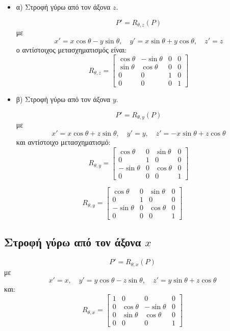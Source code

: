 \begin{itemize}
    \item α) Στροφή γύρω από τον άξονα $z$.

    \[
    P' = R_{\theta,z}(P)
    \]
    με
    \[
    x' = x \cos \theta - y \sin \theta, \quad y' = x \sin \theta + y \cos \theta, \quad z' = z
    \]
    ο αντίστοιχος μετασχηματισμός είναι:
    \[
    R_{\theta,z} = 
    \begin{bmatrix}
    \cos \theta & -\sin \theta & 0 & 0 \\
    \sin \theta & \cos \theta & 0 & 0 \\
    0 & 0 & 1 & 0 \\
    0 & 0 & 0 & 1
    \end{bmatrix}
    \]

    \item β) Στροφή γύρω από τον άξονα $y$.

    \[
    P' = R_{\theta,y}(P)
    \]
    με
    \[
    x' = x \cos \theta + z \sin \theta, \quad y' = y, \quad z' = -x \sin \theta + z \cos \theta
    \]
    και αντίστοιχο μετασχηματισμό:
    \[
    R_{\theta,y} = 
    \begin{bmatrix}
    \cos \theta & 0 & \sin \theta & 0 \\
    0 & 1 & 0 & 0 \\
    -\sin \theta & 0 & \cos \theta & 0 \\
    0 & 0 & 0 & 1
    \end{bmatrix}
    \]
\end{itemize}



\[
R_{\theta, y} = 
\begin{bmatrix}
\cos \theta & 0 & \sin \theta & 0 \\
0 & 1 & 0 & 0 \\
-\sin \theta & 0 & \cos \theta & 0 \\
0 & 0 & 0 & 1
\end{bmatrix}
\]

\subsection{ Στροφή γύρω από τον άξονα \( x \)}

\[
P' = R_{\theta, x}(P)
\]
με
\[
x' = x, \quad y' = y \cos \theta - z \sin \theta, \quad z' = y \sin \theta + z \cos \theta
\]
και:
\[
R_{\theta, x} = 
\begin{bmatrix}
1 & 0 & 0 & 0 \\
0 & \cos \theta & -\sin \theta & 0 \\
0 & \sin \theta & \cos \theta & 0 \\
0 & 0 & 0 & 1
\end{bmatrix}
\]

